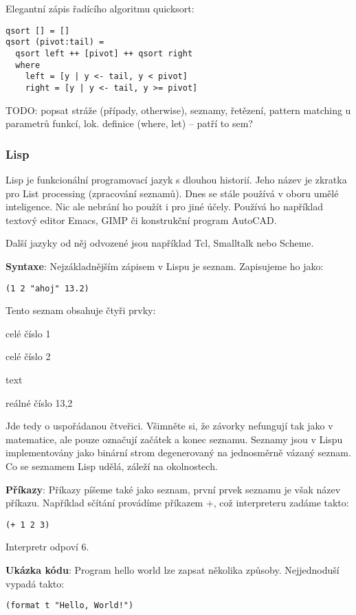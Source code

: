 Elegantní zápis řadícího algoritmu quicksort:
\begin{verbatim}
qsort [] = []
qsort (pivot:tail) = 
  qsort left ++ [pivot] ++ qsort right
  where
    left = [y | y <- tail, y < pivot]
    right = [y | y <- tail, y >= pivot]
\end{verbatim}

TODO: popsat stráže (případy, otherwise), seznamy, řetězení, pattern matching u parametrů funkcí, lok. definice (where, let) -- patří to sem?

\subsubsection*{Lisp}

Lisp je funkcionální programovací jazyk s dlouhou historií. Jeho název je zkratka pro List processing (zpracování seznamů). Dnes se stále používá v oboru umělé inteligence. Nic ale nebrání ho použít i pro jiné účely. Používá ho například textový editor Emacs, GIMP či konstrukční program AutoCAD.

Další jazyky od něj odvozené jsou například Tcl, Smalltalk nebo Scheme.


\medskip\textbf{Syntaxe}:
Nejzákladnějším zápisem v Lispu je seznam. Zapisujeme ho jako:
\begin{verbatim}
(1 2 "ahoj" 13.2)
\end{verbatim}

Tento seznam obsahuje čtyři prvky:
\begin{pitemize}
	\item celé číslo 1
	\item celé číslo 2
	\item text 
	\item reálné číslo 13,2
\end{pitemize}

Jde tedy o uspořádanou čtveřici. Všimněte si, že závorky nefungují tak jako v matematice, ale pouze označují začátek a konec seznamu. Seznamy jsou v Lispu implementovány jako binární strom degenerovaný na jednosměrně vázaný seznam. Co se seznamem Lisp udělá, záleží na okolnostech.

\textbf{Příkazy}: Příkazy píšeme také jako seznam, první prvek seznamu je však název příkazu. Například sčítání provádíme příkazem +, což interpreteru zadáme takto:
\begin{verbatim}
(+ 1 2 3)
\end{verbatim}
Interpretr odpoví 6.

\textbf{Ukázka kódu}:
Program hello world lze zapsat několika způsoby. Nejjednoduší vypadá takto:
\begin{verbatim}
(format t "Hello, World!")
\end{verbatim}

